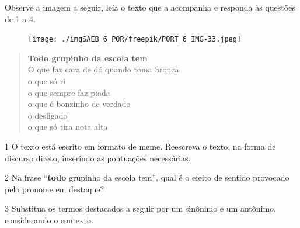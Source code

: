 \noindent Observe a imagem a seguir, leia o texto que a acompanha e responda às
questões de 1 a 4.

\pagebreak
\begin{figure}[H]
\centering\texttt{[image: ./imgSAEB\_6\_POR/freepik/PORT\_6\_IMG-33.jpeg]}
\end{figure}

\begin{verse}
\textbf{Todo grupinho da escola tem}\\
\medskip
O que faz cara de dó quando toma bronca\\
o que só ri\\
o que sempre faz piada\\
o que é bonzinho de verdade\\
o desligado\\
o que só tira nota alta\\
\end{verse}

\num{1} O texto está escrito em formato de meme. Reescreva o texto, na
forma de discurso direto, inserindo as pontuações necessárias.


\num{2} Na frase ``\textbf{todo} grupinho da escola tem'', qual é o
efeito de sentido provocado pelo pronome em destaque?


\num{3} Substitua os termos destacados a seguir por um sinônimo e um
antônimo, considerando o contexto.

